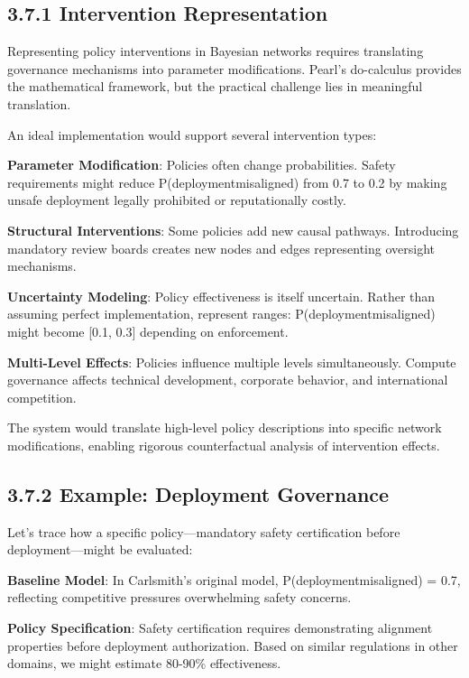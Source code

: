 \documentclass[
  11pt,
  letterpaper,
  openany]{book}
\begin{document}
\subsection{3.7.1 Intervention
Representation}\label{sec-intervention-representation}

Representing policy interventions in Bayesian networks requires
translating governance mechanisms into parameter modifications. Pearl's
do-calculus provides the mathematical framework, but the practical
challenge lies in meaningful translation.

An ideal implementation would support several intervention types:

\textbf{Parameter Modification}: Policies often change probabilities.
Safety requirements might reduce P(deployment\textbar misaligned) from
0.7 to 0.2 by making unsafe deployment legally prohibited or
reputationally costly.

\textbf{Structural Interventions}: Some policies add new causal
pathways. Introducing mandatory review boards creates new nodes and
edges representing oversight mechanisms.

\textbf{Uncertainty Modeling}: Policy effectiveness is itself uncertain.
Rather than assuming perfect implementation, represent ranges:
P(deployment\textbar misaligned) might become {[}0.1, 0.3{]} depending
on enforcement.

\textbf{Multi-Level Effects}: Policies influence multiple levels
simultaneously. Compute governance affects technical development,
corporate behavior, and international competition.

The system would translate high-level policy descriptions into specific
network modifications, enabling rigorous counterfactual analysis of
intervention effects.

\subsection{3.7.2 Example: Deployment
Governance}\label{sec-deployment-example}

Let's trace how a specific policy---mandatory safety certification
before deployment---might be evaluated:

\textbf{Baseline Model}: In Carlsmith's original model,
P(deployment\textbar misaligned) = 0.7, reflecting competitive pressures
overwhelming safety concerns.

\textbf{Policy Specification}: Safety certification requires
demonstrating alignment properties before deployment authorization.
Based on similar regulations in other domains, we might estimate 80-90\%
effectiveness.
\end{document}
